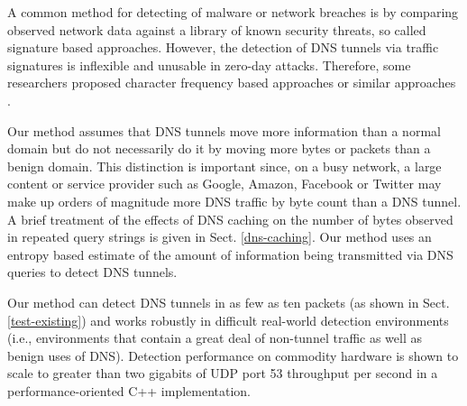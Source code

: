 \documentclass{llncs}
\begin{document}



A common method for detecting of malware or network breaches is by
comparing observed network data against a library of known security
threats, so called signature based approaches. However, the detection
of DNS tunnels via traffic signatures is inflexible and unusable in
zero-day attacks. Therefore, some researchers proposed character
frequency based approaches or similar approaches \cite{Born2010.cfa}.

Our method assumes that DNS tunnels move more information than a
normal domain but do not necessarily do it by moving more
bytes or packets than a benign domain. This distinction is important
since, on a busy network, a large content or service provider such as
Google, Amazon, Facebook or Twitter may make up orders of magnitude
more DNS traffic by byte count than a DNS tunnel. A brief treatment of
the effects of DNS caching on the number of bytes observed in repeated
query strings is given in Sect. \ref{dns-caching}. Our method uses an
entropy based estimate of the amount of information being transmitted
via DNS queries to detect DNS tunnels.

Our method can detect DNS tunnels in as few as ten packets (as shown
in Sect. \ref{test-existing}) and works robustly in difficult
real-world detection environments (i.e., environments that contain a
great deal of non-tunnel traffic as well as benign uses of
DNS). Detection performance on commodity hardware is shown to scale to
greater than two gigabits of UDP port 53 throughput per second in a
performance-oriented C++ implementation.
\end{document}

